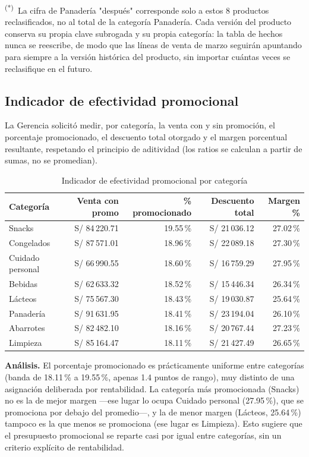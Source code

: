 \documentclass[11pt,a4paper]{article}
\begin{document}
\noindent\textsuperscript{(*)}~La cifra de Panadería "después" corresponde solo a estos 8 productos reclasificados, no al total de la categoría Panadería. Cada versión del producto conserva su propia clave subrogada y su propia categoría: la tabla de hechos nunca se reescribe, de modo que las líneas de venta de marzo seguirán apuntando para siempre a la versión histórica del producto, sin importar cuántas veces se reclasifique en el futuro.

\subsection{Indicador de efectividad promocional}

La Gerencia solicitó medir, por categoría, la venta con y sin promoción, el porcentaje promocionado, el descuento total otorgado y el margen porcentual resultante, respetando el principio de aditividad (los ratios se calculan a partir de sumas, no se promedian).

\begin{table}[h!]
\centering
\caption{Indicador de efectividad promocional por categoría}
\label{tab:promo}
\begin{tabular}{lrrrr}
\toprule
\textbf{Categoría} & \textbf{Venta con promo} & \textbf{\% promocionado} & \textbf{Descuento total} & \textbf{Margen \%} \\
\midrule
Snacks            & S/ 84\,220.71 & 19.55\,\% & S/ 21\,036.12 & 27.02\,\% \\
Congelados        & S/ 87\,571.01 & 18.96\,\% & S/ 22\,089.18 & 27.30\,\% \\
Cuidado personal  & S/ 66\,990.55 & 18.60\,\% & S/ 16\,759.29 & 27.95\,\% \\
Bebidas           & S/ 62\,633.32 & 18.52\,\% & S/ 15\,446.34 & 26.34\,\% \\
Lácteos           & S/ 75\,567.30 & 18.43\,\% & S/ 19\,030.87 & 25.64\,\% \\
Panadería         & S/ 91\,631.95 & 18.41\,\% & S/ 23\,194.04 & 26.10\,\% \\
Abarrotes         & S/ 82\,482.10 & 18.16\,\% & S/ 20\,767.44 & 27.23\,\% \\
Limpieza          & S/ 85\,164.47 & 18.11\,\% & S/ 21\,427.49 & 26.65\,\% \\
\bottomrule
\end{tabular}
\end{table}

\textbf{Análisis.} El porcentaje promocionado es prácticamente uniforme entre categorías (banda de 18.11\,\% a 19.55\,\%, apenas 1.4 puntos de rango), muy distinto de una asignación deliberada por rentabilidad. La categoría más promocionada (Snacks) no es la de mejor margen —ese lugar lo ocupa Cuidado personal (27.95\,\%), que se promociona por debajo del promedio—, y la de menor margen (Lácteos, 25.64\,\%) tampoco es la que menos se promociona (ese lugar es Limpieza). Esto sugiere que el presupuesto promocional se reparte casi por igual entre categorías, sin un criterio explícito de rentabilidad.
\end{document}

